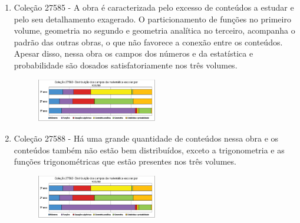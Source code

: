 \documentclass[a4paper, 12pt]{article}
\begin{document}
\begin{enumerate}
\begin{enumerate}
      \item Coleção 27585 - A obra é caracterizada pelo excesso de conteúdos a estudar e pelo seu detalhamento exagerado. O particionamento de funções no primeiro volume, geometria no segundo e geometria analítica no terceiro, acompanha o padrão das outras obras, o que não favorece a conexão entre os conteúdos. Apesar disso, nessa obra os campos dos números e da estatística e probabilidade são dosados satisfatoriamente nos três volumes.
      \begin{figure}[h!]
      \centering
      \includegraphics[width=0.5\textwidth]{4}
      \end{figure}

      \item Coleção 27588 - Há uma grande quantidade de conteúdos nessa obra e os conteúdos também não estão bem distribuídos, exceto a trigonometria e as funções trigonométricas que estão presentes nos três volumes.
      \begin{figure}[h!]
      \centering
      \includegraphics[width=0.5\textwidth]{5}
      \end{figure}


\end{enumerate}
\end{enumerate}
\end{document}
